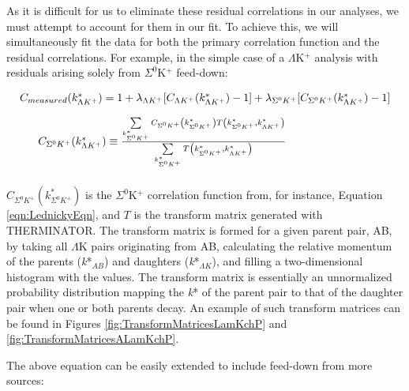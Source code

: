 \documentclass[../AnalysisNoteJBuxton.tex]{subfiles}
\begin{document}
As it is difficult for us to eliminate these residual correlations in our analyses, we must attempt to account for them in our fit.
To achieve this, we will simultaneously fit the data for both the primary correlation function and the residual correlations.  For example, in the simple case of a $\Lambda$K$^{+}$ analysis with residuals arising solely from $\Sigma^{0}$K$^{+}$ feed-down:

\begin{equation}
\begin{array}{l}
\vspace{4mm}
 C_{measured}(k^{*}_{\Lambda K^{+}}) = 1 + \lambda_{\Lambda K^{+}}[C_{\Lambda K^{+}}(k^{*}_{\Lambda K^{+}})-1] + \lambda_{\Sigma^{0}K^{+}}[C_{\Sigma^{0}K^{+}}(k^{*}_{\Lambda K^{+}})-1] \\
\vspace{2mm}
  ~~~~~C_{\Sigma^{0}K^{+}}(k^{*}_{\Lambda K^{+}}) \equiv \frac{\sum\limits_{k^{*}_{\Sigma^{0}K^{+}}} C_{\Sigma^{0}K^{+}}\left(k^{*}_{\Sigma^{0}K^{+}}\right) T\left(k^{*}_{\Sigma^{0}K^{+}},k^{*}_{\Lambda K^{+}}\right)}{\sum\limits_{k^{*}_{\Sigma^{0}K^{+}}} T\left(k^{*}_{\Sigma^{0}K^{+}},k^{*}_{\Lambda K^{+}}\right)}
\end{array} 
\label{eqn:SimpleResiduals}
\end{equation}

$C_{\Sigma^{0}K^{+}}(k^{*}_{\Sigma^{0}K^{+}})$ is the $\Sigma^{0}$K$^{+}$ correlation function from, for instance, Equation \ref{eqn:LednickyEqn}, and $T$ is the transform matrix generated with THERMINATOR.  The transform matrix is formed for a given parent pair, AB, by taking all $\Lambda$K pairs originating from AB, calculating the relative momentum of the parents (\textit{k}*$_{AB}$) and daughters (\textit{k}*$_{\Lambda K}$), and filling a two-dimensional histogram with the values. The transform matrix is essentially an unnormalized probability distribution mapping the \textit{k}* of the parent pair to that of the daughter pair when one or both parents decay.  An example of such transform matrices can be found in Figures \ref{fig:TransformMatricesLamKchP} and \ref{fig:TransformMatricesALamKchP}.

  The above equation can be easily extended to include feed-down from more sources:
\end{document}
